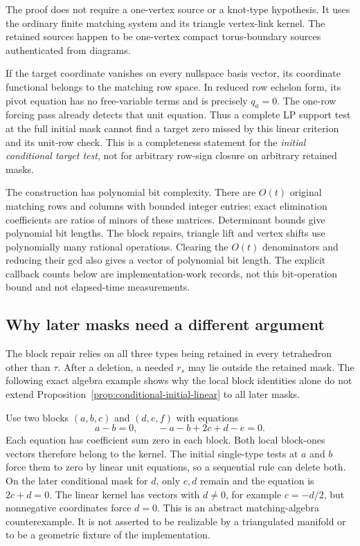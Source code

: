The proof does not require a one-vertex source or a knot-type hypothesis.
It uses the ordinary finite matching system and its triangle vertex-link
kernel.  The retained sources happen to be one-vertex compact torus-boundary
sources authenticated from diagrams.

If the target coordinate vanishes on every nullspace basis vector,
its coordinate functional belongs to the matching row space.  In
reduced row echelon form, its pivot equation has no free-variable
terms and is precisely $q_a=0$.  The one-row forcing pass already
detects that unit equation.  Thus a complete LP support test at the
full initial mask cannot find a target zero missed by this linear
criterion and its unit-row check.  This is a completeness statement
for the \emph{initial conditional target test}, not for arbitrary
row-sign closure on arbitrary retained masks.

The construction has polynomial bit complexity.  There are $O(t)$
original matching rows and columns with bounded integer entries;
exact elimination coefficients are ratios of minors of these matrices.
Determinant bounds give polynomial bit lengths.  The block repairs,
triangle lift and vertex shifts use polynomially many rational
operations.  Clearing the $O(t)$ denominators and reducing their gcd
also gives a vector of polynomial bit length.  The explicit callback
counts below are implementation-work records, not this bit-operation
bound and not elapsed-time measurements.

\subsection{Why later masks need a different argument}

The block repair relies on all three types being retained in every
tetrahedron other than $\tau$.  After a deletion, a needed $r_s$ may
lie outside the retained mask.  The following exact algebra example
shows why the local block identities alone do not extend
Proposition~\ref{prop:conditional-initial-linear} to all later masks.

Use two blocks $(a,b,c)$ and $(d,e,f)$ with equations
\[
                a-b=0,\qquad -a-b+2c+d-e=0.
\]
Each equation has coefficient sum zero in each block.  Both local
block-ones vectors therefore belong to the kernel.  The initial
single-type tests at $a$ and $b$ force them to zero by linear unit
equations, so a sequential rule can delete both.  On the later
conditional mask for $d$, only $c,d$ remain and the equation is
$2c+d=0$.  The linear kernel has vectors with $d\ne0$, for example
$c=-d/2$, but nonnegative coordinates force $d=0$.
This is an abstract matching-algebra counterexample.  It is not
asserted to be realizable by a triangulated manifold or to be a
geometric fixture of the implementation.

